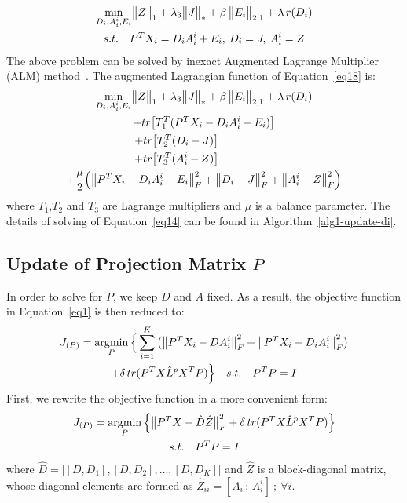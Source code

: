 \documentclass[journal]{IEEEtran}
\DeclareMathOperator*{\argmin}{\arg\!\min}
\DeclarePairedDelimiter\norm{\lVert}{\rVert}
\begin{document}
\begin{gather}
\min_{D_i,A_i^i,E_i} \norm[\big]{Z}_{1} + \lambda_3 \norm[\big]{J}_{*} + \beta \, \norm[\big]{E_i}_{2,1} + \lambda \, r(D_i)
\label{eq18} \\ \notag
s.t. \quad P^T X_i = D_i A_i^i + E_i , \> D_i = J, \> A_i^i = Z 
\end{gather}
The above problem can be solved by inexact Augmented Lagrange Multiplier (ALM) method~\cite{ALM-Proof}. The augmented Lagrangian function of Equation~\eqref{eq18} is:
\begin{gather}
\min_{D_i,A_i^i,E_i} \norm[\big]{Z}_{1} + \lambda_3 \norm[\big]{J}_{*} + \beta \, \norm[\big]{E_i}_{2,1} + \lambda \, r(D_i) 
\label{eq19} \\ \notag
+ tr \big[ T_1^T (P^T X_i - D_i A_i^i - E_i) \big] 
\\ \notag
+ tr \big[ T_2^T (D_i - J) \big] \hspace{50pt} 
\\ \notag
+ tr \big[ T_3^T (A_i^i - Z) \big] \hspace{50pt} 
\\ \notag
+ \frac{\mu}{2} \Big( \norm[\big]{P^T X_i - D_i A_i^i - E_i}_{F}^2 + \norm[\big]{D_i - J}_{F}^2 + \norm[\big]{A_i^i - Z}_{F}^2 \Big) 
\end{gather}
where $T_1$,$T_2$ and $T_3$ are Lagrange multipliers and $\mu$ is a balance parameter. The details of solving of Equation~\eqref{eq14} can be found in Algorithm~\ref{alg1-update-di}.
\subsection{Update of Projection Matrix $P$}
In order to solve for $P$, we keep $D$ and $A$ fixed. As a result, the objective function in Equation~\eqref{eq1} is then reduced to:
\begin{gather}
J_{(P)} = \argmin_{P} \Big\{  \sum\limits_{i=1}^K \big( \norm[\big]{P^T X_i - D A_i^i}_{F}^2 + \norm[\big]{P^T X_i - D_i A_i^i}_{F}^2 \big)  \label{eq20} \\ \notag 
+ \delta \, tr(P^T X \hat{L}^{p} X^T P) \Big\}
\quad s.t. \quad P^T P = I
\end{gather}
First, we rewrite the objective function in a more convenient form:
\begin{gather}
J_{(P)} = \argmin_{P} \Big\{ \norm[\big]{P^T X - \hat{D} \hat{Z}}_{F}^2 + \delta \, tr(P^T X \hat{L}^{p} X^T P) \Big\} 
\label{eq21} \\ \notag
s.t. \quad P^T P = I
\end{gather}
where $ \hat{D} = \Big[ [D,D_1] , [D,D_2], \dots, [D,D_K] \Big]$ and $\hat{Z}$ is a block-diagonal matrix, whose diagonal elements are formed as $\hat{Z}_{ii} = [A_i \, ; \, A_i^i] \> ; \> \forall i$. 
\end{document}
